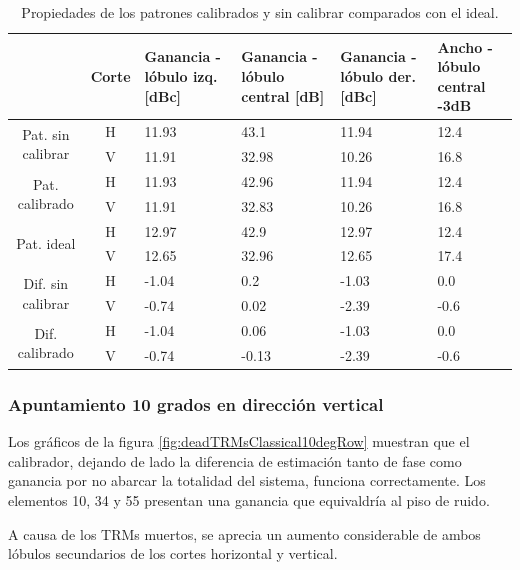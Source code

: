 \begin{table}[H]
  \footnotesize
  \centering
  \begin{tabular}{|c|c|p{2cm}|p{2.5cm}|p{2.5cm}|p{2.5cm}|}
    \cline{2-6}
    \multicolumn{1}{c|}{} & Corte & Ganancia - lóbulo izq. [dBc] & Ganancia - lóbulo central [dB] &
    Ganancia - lóbulo der. [dBc] & Ancho - lóbulo central -3dB \tabularnewline\hline
    \multirow{2}{2cm}{Pat. sin calibrar} & H & 11.93 & 43.1 & 11.94 & 12.4 \tabularnewline\cline{2-6}
     & V & 11.91 & 32.98 & 10.26 & 16.8 \tabularnewline\hline
    \multirow{2}{2cm}{Pat. calibrado} & H & 11.93 & 42.96 & 11.94 & 12.4 \tabularnewline\cline{2-6}
     & V & 11.91 & 32.83 & 10.26 & 16.8 \tabularnewline\hline
    \multirow{2}{2cm}{Pat. ideal} & H & 12.97 & 42.9 & 12.97 & 12.4 \tabularnewline\cline{2-6}
     & V & 12.65 & 32.96 & 12.65 & 17.4 \tabularnewline\hline
    \multirow{2}{2cm}{Dif. sin calibrar} & H & -1.04 & 0.2 & -1.03 & 0.0\tabularnewline\cline{2-6}
     & V & -0.74 & 0.02 & -2.39 & -0.6 \tabularnewline\hline
    \multirow{2}{2cm}{Dif. calibrado} & H & -1.04 & 0.06 & -1.03 & 0.0 \tabularnewline\cline{2-6}
     & V & -0.74 & -0.13 & -2.39 & -0.6 \tabularnewline\hline
  \end{tabular}
  \caption{Propiedades de los patrones calibrados y sin calibrar comparados con el ideal.}
  \label{tab:deadTRMsClassical10degCol}
\end{table}


\subsubsection{Apuntamiento 10 grados en dirección vertical}

Los gráficos de la figura \ref{fig:deadTRMsClassical10degRow} muestran que el calibrador, dejando de lado la diferencia de 
estimación tanto de fase como ganancia por no abarcar la totalidad del sistema, funciona correctamente. Los elementos 10, 34 y 
55 presentan una ganancia que equivaldría al piso de ruido.

A causa de los TRMs muertos, se aprecia un aumento considerable de ambos lóbulos secundarios de los cortes horizontal y vertical.

